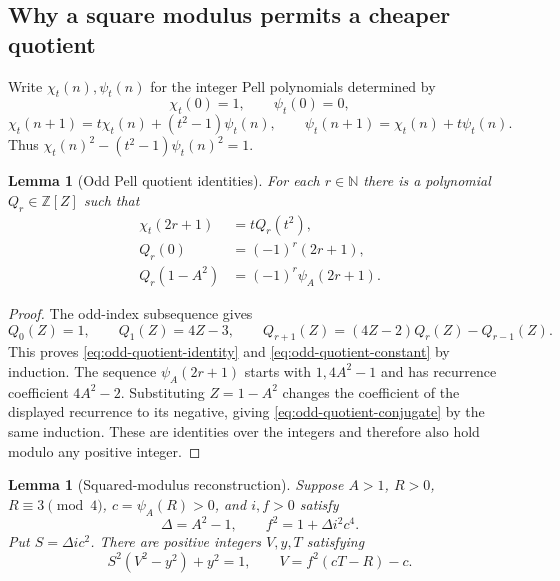 \documentclass[11pt,letterpaper]{article}
\newtheorem{lemma}[theorem]{Lemma}
\theoremstyle{remark}\newtheorem{remark}[theorem]{Remark}
\newcommand{\Z}{\mathbb Z}\newcommand{\N}{\mathbb N}
\begin{document}
\subsection{Why a square modulus permits a cheaper quotient}

Write \(\chi_t(n),\psi_t(n)\) for the integer Pell polynomials determined by
\[
 \chi_t(0)=1,\qquad \psi_t(0)=0,
\]
\[
 \chi_t(n+1)=t\chi_t(n)+(t^2-1)\psi_t(n),\qquad
 \psi_t(n+1)=\chi_t(n)+t\psi_t(n).
\]
Thus \(\chi_t(n)^2-(t^2-1)\psi_t(n)^2=1\).

\begin{lemma}[Odd Pell quotient identities]
\label{lem:odd-quotient}
For each \(r\in\N\) there is a polynomial \(Q_r\in\Z[Z]\) such that
\begin{align}
 \chi_t(2r+1)&=tQ_r(t^2),\label{eq:odd-quotient-identity}\\
 Q_r(0)&=(-1)^r(2r+1),\label{eq:odd-quotient-constant}\\
 Q_r(1-A^2)&=(-1)^r\psi_A(2r+1).
 \label{eq:odd-quotient-conjugate}
\end{align}
\end{lemma}

\begin{proof}
The odd-index subsequence gives
\[
 Q_0(Z)=1,\qquad Q_1(Z)=4Z-3,\qquad
 Q_{r+1}(Z)=(4Z-2)Q_r(Z)-Q_{r-1}(Z).
\]
This proves \eqref{eq:odd-quotient-identity} and
\eqref{eq:odd-quotient-constant} by induction.  The sequence
\(\psi_A(2r+1)\) starts with \(1,4A^2-1\) and has recurrence coefficient
\(4A^2-2\).  Substituting \(Z=1-A^2\) changes the coefficient of the
displayed recurrence to its negative, giving
\eqref{eq:odd-quotient-conjugate} by the same induction.  These are
identities over the integers and therefore also hold modulo any positive
integer.
\end{proof}

\begin{lemma}[Squared-modulus reconstruction]
\label{lem:squared-modulus-reconstruction}
Suppose \(A>1\), \(R>0\), \(R\equiv3\pmod4\),
\(c=\psi_A(R)>0\), and \(i,f>0\) satisfy
\[
 \Delta=A^2-1,\qquad f^2=1+\Delta i^2c^4.
\]
Put \(S=\Delta ic^2\).  There are positive integers \(V,y,T\) satisfying
\[
 S^2(V^2-y^2)+y^2=1,\qquad V=f^2(cT-R)-c.
\]
\end{lemma}
\end{document}
